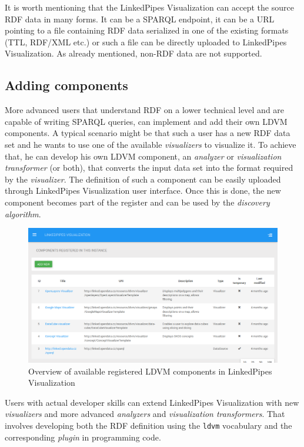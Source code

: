 It is worth mentioning that the LinkedPipes Visualization can accept the source RDF data in many forms. It can be a SPARQL endpoint, it can be a URL pointing to a file containing RDF data serialized in one of the existing formats (TTL, RDF/XML etc.) or such a file can be directly uploaded to LinkedPipes Visualization. As already mentioned, non-RDF data are not supported.

\subsection{Adding components}

More advanced users that understand RDF on a lower technical level and are capable of writing SPARQL queries, can implement and add their own LDVM components. A typical scenario might be that such a user has a new RDF data set and he wants to use one of the available \emph{visualizers} to visualize it. To achieve that, he can develop his own LDVM component, an \emph{analyzer} or \emph{visualization transformer} (or both), that converts the input data set into the format required by the \emph{visualizer}. The definition of such a component can be easily uploaded through LinkedPipes Visualization user interface. Once this is done, the new component becomes part of the register and can be used by the \emph{discovery algorithm}.

\begin{figure}
	\centering
	\includegraphics[width=130mm]{img/03_linked_pipes_components.png}
	\caption{Overview of available registered LDVM components in LinkedPipes Visualization} 
	\label{fig:linked-pipes-components}
\end{figure}

Users with actual developer skills can extend LinkedPipes Visualization with new \emph{visualizers} and more advanced \emph{analyzers} and \emph{visualization transformers}. That involves developing both the RDF definition using the \texttt{ldvm} vocabulary and the corresponding \emph{plugin} in programming code. 

